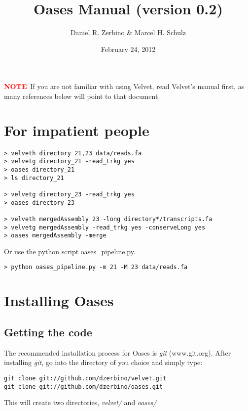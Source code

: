 \documentclass[12pt]{article}
\newcommand{\NOTE}{\textcolor{red}{\textbf{NOTE}}}
\begin{document}
\title{Oases Manual (version 0.2)}
\author{Daniel R. Zerbino \& Marcel H. Schulz}
\date{February 24, 2012}
\maketitle
\tableofcontents

\newpage

\NOTE\ If you are not familiar with using Velvet, read Velvet's manual first, as many references below will point to that document.

\section{For impatient people}
\begin{verbatim}
> velveth directory 21,23 data/reads.fa
> velvetg directory_21 -read_trkg yes
> oases directory_21
> ls directory_21

> velvetg directory_23 -read_trkg yes
> oases directory_23

> velveth mergedAssembly 23 -long directory*/transcripts.fa
> velvetg mergedAssembly -read_trkg yes -conserveLong yes
> oases mergedAssembly -merge
\end{verbatim}

Or use the python script oases\_pipeline.py.

\begin{verbatim}
> python oases_pipeline.py -m 21 -M 23 data/reads.fa
\end{verbatim}

\section{Installing Oases} 

\subsection{Getting the code}

The recommended installation process for Oases is \emph{git} (www.git.org). After installing \emph{git}, go into the directory of you choice and simply type:

\begin{verbatim}
git clone git://github.com/dzerbino/velvet.git
git clone git://github.com/dzerbino/oases.git
\end{verbatim}

This will create two directories, \emph{velvet/} and \emph{oases/}
\end{document}
